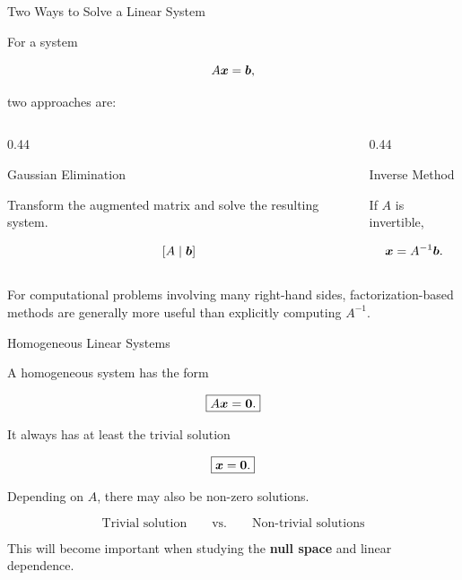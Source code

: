 \begin{frame}{Two Ways to Solve a Linear System}

For a system

\[
A\bm{x}=\bm{b},
\]

two approaches are:

\vspace{0.3cm}

\begin{columns}[T,totalwidth=\textwidth]

\begin{column}{0.44\textwidth}

\begin{block}{Gaussian Elimination}

Transform the augmented matrix and solve the resulting system.

\[
[A\mid\bm{b}]
\]

\end{block}

\end{column}

\begin{column}{0.44\textwidth}

\begin{block}{Inverse Method}

If $A$ is invertible,

\[
\bm{x}=A^{-1}\bm{b}.
\]

\end{block}

\end{column}

\end{columns}

\vspace{0.5cm}

For computational problems involving many right-hand sides,
factorization-based methods are generally more useful than
explicitly computing $A^{-1}$.

\end{frame}



\begin{frame}{Homogeneous Linear Systems}

A homogeneous system has the form

\[
\boxed{
A\bm{x}=\mathbf{0}.
}
\]

It always has at least the trivial solution

\[
\boxed{
\bm{x}=\mathbf{0}.
}
\]

\vspace{0.4cm}

Depending on $A$, there may also be non-zero solutions.

\vspace{0.4cm}

\[
\boxed{
\text{Trivial solution}
\qquad\text{vs.}\qquad
\text{Non-trivial solutions}
}
\]

This will become important when studying the
\textbf{null space} and linear dependence.

\end{frame}